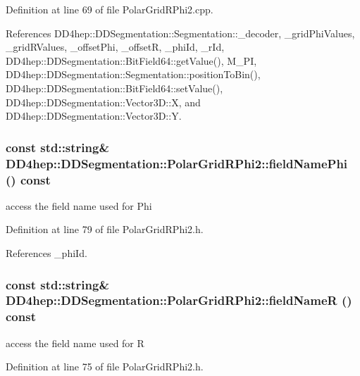 Definition at line 69 of file PolarGridRPhi2.cpp.

References DD4hep::DDSegmentation::Segmentation::\_\-decoder, \_\-gridPhiValues, \_\-gridRValues, \_\-offsetPhi, \_\-offsetR, \_\-phiId, \_\-rId, DD4hep::DDSegmentation::BitField64::getValue(), M\_\-PI, DD4hep::DDSegmentation::Segmentation::positionToBin(), DD4hep::DDSegmentation::BitField64::setValue(), DD4hep::DDSegmentation::Vector3D::X, and DD4hep::DDSegmentation::Vector3D::Y.\hypertarget{class_d_d4hep_1_1_d_d_segmentation_1_1_polar_grid_r_phi2_a4c0c6f5fc47520801723c337224e546d}{
\subsubsection[{fieldNamePhi}]{\setlength{\rightskip}{0pt plus 5cm}const std::string\& DD4hep::DDSegmentation::PolarGridRPhi2::fieldNamePhi () const}}
\label{class_d_d4hep_1_1_d_d_segmentation_1_1_polar_grid_r_phi2_a4c0c6f5fc47520801723c337224e546d}


access the field name used for Phi 

Definition at line 79 of file PolarGridRPhi2.h.

References \_\-phiId.\hypertarget{class_d_d4hep_1_1_d_d_segmentation_1_1_polar_grid_r_phi2_a95ef3314ebba93b87f5a508efb2e7066}{
\subsubsection[{fieldNameR}]{\setlength{\rightskip}{0pt plus 5cm}const std::string\& DD4hep::DDSegmentation::PolarGridRPhi2::fieldNameR () const}}
\label{class_d_d4hep_1_1_d_d_segmentation_1_1_polar_grid_r_phi2_a95ef3314ebba93b87f5a508efb2e7066}


access the field name used for R 

Definition at line 75 of file PolarGridRPhi2.h.

